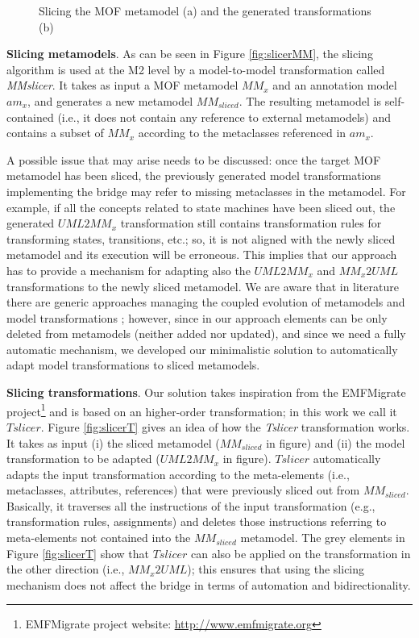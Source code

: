 \begin{figure}
  \caption{Slicing the MOF metamodel (a) and the generated transformations (b)}
  \label{fig:slicer}
\end{figure}
\vspace{-.4cm}

\textbf{Slicing metamodels}. As can be seen in Figure \ref{fig:slicerMM}, the slicing algorithm is used at the M2 level by a model-to-model transformation called \textit{MMslicer}.
It takes as input a MOF metamodel $MM_x$ and an annotation model $am_x$, and generates a new metamodel $MM_{sliced}$.
The resulting metamodel is self-contained (i.e., it does not contain any reference to external metamodels)
and contains a subset of $MM_x$ according to the metaclasses referenced in $am_x$.

A possible issue that may arise needs to be discussed: once the target MOF metamodel has been sliced, the
previously generated model transformations implementing the bridge may refer to missing metaclasses in the metamodel.
For example, if all the concepts related to state machines have been sliced out, the generated $UML2MM_x$ transformation still contains
transformation rules for transforming states, transitions, etc.; so, it is not aligned with the newly sliced metamodel and its execution will be erroneous.
This implies that our approach has to provide a mechanism for adapting also the $UML2MM_x$ and $MM_x2UML$ transformations
to the newly sliced metamodel.
We are aware that in literature there are generic approaches managing the coupled evolution of metamodels and model transformations
\cite{TransEvolution}; however, since in our approach elements
can be only deleted from metamodels (neither added nor updated), and since we need a fully automatic mechanism, we developed our minimalistic solution to automatically adapt model transformations to sliced metamodels.

\textbf{Slicing transformations}.
Our solution takes inspiration from the EMFMigrate project\footnote{EMFMigrate project website: \small{\url{http://www.emfmigrate.org}}}
and is based on an higher-order transformation; in this work we call it $Tslicer$.
Figure \ref{fig:slicerT} gives an idea of how the \textit{Tslicer} transformation works. It takes as input (i) the sliced metamodel
($MM_{sliced}$ in figure) and (ii) the model transformation to be adapted ($UML2MM_x$ in figure). $Tslicer$ automatically adapts the input transformation according to the meta-elements (i.e., metaclasses, attributes, references) that were previously sliced out from $MM_{sliced}$.
Basically, it traverses all the instructions of the input transformation (e.g., transformation rules, assignments)
and deletes those instructions referring to meta-elements not contained into the $MM_{sliced}$ metamodel.
The grey elements in Figure \ref{fig:slicerT} show that $Tslicer$ can also be
applied on the transformation in the other direction (i.e., $MM_x2UML$); this ensures that using the slicing mechanism does not affect
the bridge in terms of automation and bidirectionality.


